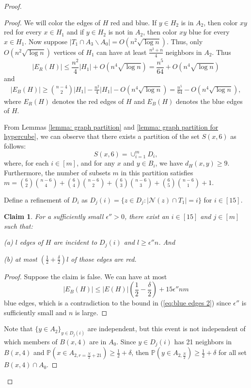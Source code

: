 \documentclass[reqno,11pt]{amsart}
\newtheorem{claim}[theorem]{Claim}
\renewcommand{\leq}{\leqslant}
\renewcommand{\geq}{\geqslant}
\begin{document}
\begin{proof}
\begin{proof}
We will color the edges of $H$ red and blue. If $y \in H_2$ is in $A_2$, then color $xy$ red for every $x \in H_1$ and if $y \in H_2$ is not in $A_2$, then color $xy$ blue for every $x \in H_1$. Now suppose $|T_1 \cap A_3 \backslash A_0|=O(n^2\sqrt{\log n})$. Thus, only $O(n^2 \sqrt{\log n})$ vertices of $H_1$ can have at least $\frac{n^2+n}{4}$ neighbors in $A_2$. Thus 
$$|E_R(H)| \leq \frac{n^2}{4}|H_1|+O(n^4 \sqrt{\log n})=\frac{n^5}{64}+O(n^4 \sqrt{\log n})$$
and 
\begin{align} \label{eq:blue edges 2}
    |E_B(H)| \geq \binom{n-4}{2}|H_1|-\frac{n^2}{4}|H_1|-O(n^4 \sqrt{\log n})=\frac{n^5}{64}-O(n^4 \sqrt{\log n}),
\end{align}
where $E_R(H)$ denotes the red edges of $H$ and $E_B(H)$ denotes the blue edges of $H$.

From Lemmas \ref{lemma: graph partition} and \ref{lemma: graph partition for hypercube}, we can observe that there exists a partition of the set $S(x,6)$ as follows:
$$S(x,6)= \cup_{i=1}^m D_i,$$
where, for each $i \in [m]$, and for any $x$ and $y \in B_i$, we have $d_H(x,y) \geq 9$. Furthermore, the number of subsets $m$ in this partition satisfies $m=\binom{6}{2} \binom{n-6}{4}+\binom{6}{4} \binom{n-6}{2}+\binom{6}{3} \binom{n-6}{3}+\binom{6}{5} \binom{n-6}{1}+1$.

Define a refinement of $D_i$ as $D_j(i)=\{z \in D_j: |\mathcal{N}(z) \cap T_1|=i\}$ for $i \in [15].$

\begin{claim} For a sufficiently small $\epsilon'' >0$, there exist an $i \in[15]$ and $j \in [m]$ such that:

(a) $l$ edges of $H$ are incident to $D_j(i)$ and $l \geq \epsilon'' n$. And

(b) at most $(\frac{1}{2}+\frac{\delta}{2})l$ of those edges are red.
\end{claim}
\begin{proof}
Suppose the claim is false. We can have at most 
$$|E_B(H)| \leq |E(H)|(\frac{1}{2}-\frac{\delta}{2})+15\epsilon'' nm$$ blue edges, which is a contradiction to the bound in (\ref{eq:blue edges 2}) since $\epsilon''$ is sufficiently small and $n$ is large.
\end{proof}


Note that $\{ y \in A_2\}_{y \in D_j(i)}$ are independent, but this event is not independent of which members of $B(x,4)$ are in $A_0$. Since $y \in D_j(i)$ has 21 neighbors in $B(x,4)$ and $\mathbb{P}(x \in A_{2,r=\frac{N}{2}+21}) \geq \frac{1}{2}+\delta$, then $\mathbb{P}(y \in A_{2,\frac{N}{2}}) \geq \frac{1}{2}+\delta$ for all set $B(x,4) \cap A_0$.


\end{proof}
\end{proof}
\end{document}
